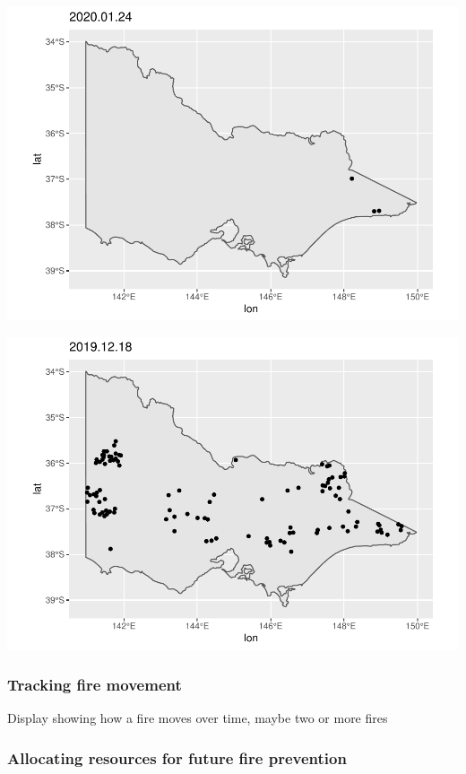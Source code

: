 \begin{Schunk}

\includegraphics[width=0.8\linewidth]{clustering_paper_files/figure-latex/unnamed-chunk-4-1} \end{Schunk}

\begin{Schunk}

\includegraphics[width=0.8\linewidth]{clustering_paper_files/figure-latex/unnamed-chunk-5-1} \end{Schunk}

\hypertarget{tracking-fire-movement}{%
\subsubsection{Tracking fire movement}\label{tracking-fire-movement}}

Display showing how a fire moves over time, maybe two or more fires

\hypertarget{allocating-resources-for-future-fire-prevention}{%
\subsubsection{Allocating resources for future fire
prevention}\label{allocating-resources-for-future-fire-prevention}}

